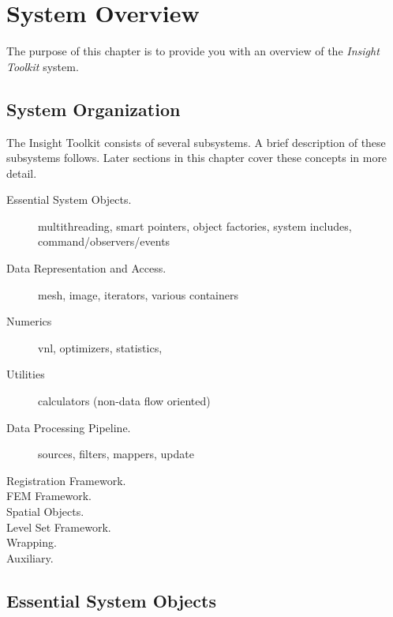 \chapter{System Overview}
\label{chapter:SystemOverview}

The purpose of this chapter is to provide you with an overview of the
\emph{Insight Toolkit} system. 

\section{System Organization}
\label{sec:SystemOrganization}

The Insight Toolkit consists of several subsystems. A brief
description of these subsystems follows. Later sections in this chapter
cover these concepts in more detail.

\begin{description}
	\item[Essential System Objects.]
	multithreading, smart pointers, object factories, system includes,
	command/observers/events

	\item[Data Representation and Access.]
	mesh, image, iterators, various containers

	\item[Numerics]
	vnl, optimizers, statistics, 

	\item[Utilities]
	calculators (non-data flow oriented)

	\item[Data Processing Pipeline.]
	sources, filters, mappers, update

	\item[Registration Framework.]

	\item[FEM Framework.]

	\item[Spatial Objects.]

	\item[Level Set Framework.]

	\item[Wrapping.]

	\item[Auxiliary.]
	
\end{description}


\section{Essential System Objects}
\label{sec:EssentialSystemObjects}


